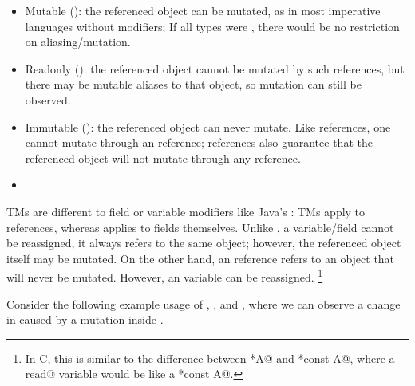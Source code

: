\begin{itemize}
\item Mutable (\Q@mut@): the referenced object can be mutated, as in most imperative languages without modifiers; 
If all types were \Q@mut@, there would be no restriction on aliasing/mutation.
\item Readonly (\Q@read@): the referenced object cannot be mutated by such references, but there may be mutable aliases to that object, so mutation can still be observed. 
\item Immutable (\Q@imm@): the referenced object can never mutate. Like \Q@read@ references, one cannot mutate through an \Q@imm@ reference; \Q@imm@ references also guarantee that the referenced object will not mutate through any reference.
\item {}
\end{itemize}
TMs are different to field or variable modifiers like Java's \Q@final@: TMs apply to references, whereas \Q@final@ applies to fields themselves. Unlike \Q@imm@, a \Q@final@ variable/field cannot be reassigned, it always refers to the same object; however, the referenced object itself may be mutated.
On the other hand, an \Q@imm@ reference refers to an object that will never be mutated. However, an \Q@imm@ variable can be reassigned. \footnote{In C, this is similar to the difference between \Q@const *A@ and \Q@*const A@, where a \Q@final read@ variable would be like a \Q@const *const A@.}



\noindent Consider the following  example usage of \Q@mut@, \Q@imm@, and \Q@read@, where we can observe a change in \Q@rp@ caused by a mutation inside \Q@mp@.

